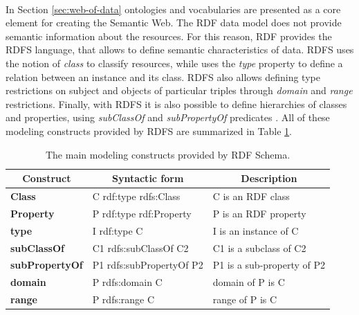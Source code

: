 \paragraph*{}
In Section \ref{sec:web-of-data} ontologies and vocabularies are presented as a core element for creating the Semantic Web. The \ac{RDF} data model does not provide semantic information about the resources. For this reason, \ac{RDF} provides the \ac{RDFS} language, that allows to define semantic characteristics of data. \acl{RDFS} uses the notion of \textit{class} to classify resources, while uses the \textit{type} property to define a relation between an instance and its class. \acl{RDFS} also allows defining type restrictions on subject and objects of particular triples through \textit{domain} and \textit{range} restrictions. Finally, with \acl{RDFS} it is also possible to define hierarchies of classes and properties, using \textit{subClassOf} and \textit{subPropertyOf} predicates \cite{world2014rdfprimer}. All of these modeling constructs provided by \acl{RDFS} are summarized in Table \ref{tab:rdfs-constructs}.

\begin{table}[!ht]
    \centering
    \doublespacing
    \begin{tabular}{|l|l|l|}
        \hline
        \multicolumn{1}{|c|}{\textbf{Construct}} & \multicolumn{1}{c|}{\textbf{Syntactic form}} & \multicolumn{1}{c|}{\textbf{Description}}            \\ \hline
        \textbf{Class}                           & C rdf:type rdfs:Class                        & C is an RDF class                       \\ \hline
        \textbf{Property}                        & P rdf:type rdf:Property                      & P is an RDF property                    \\ \hline
        \textbf{type}                            & I rdf:type C                                 & I is an instance of C         \\ \hline
        \textbf{subClassOf}                      & C1 rdfs:subClassOf C2                        & C1 is a subclass of C2           \\ \hline
        \textbf{subPropertyOf}                   & P1 rdfs:subPropertyOf P2                     & P1 is a sub-property of P2 \\ \hline
        \textbf{domain}                          & P rdfs:domain C                              & domain of P is C             \\ \hline
        \textbf{range}                           & P rdfs:range C                               & range of P is C              \\ \hline
    \end{tabular}
    \caption{The main modeling constructs provided by RDF Schema.}
    \label{tab:rdfs-constructs}
\end{table}

